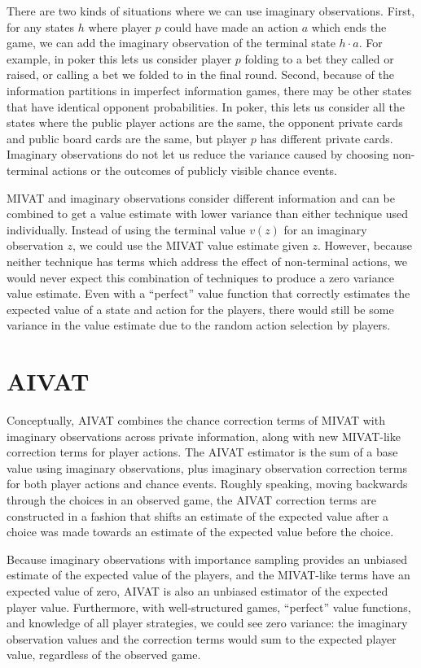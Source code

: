 \documentclass[letterpaper]{article}
\def\VAT{AIVAT}
\begin{document}
There are two kinds of situations where we can use imaginary
observations. First, for any states $h$ where player $p$ could have
made an action $a$ which ends the game, we can add the imaginary
observation of the terminal state $h \cdot a$. For example, in poker
this lets us consider player $p$ folding to a bet they called or
raised, or calling a bet we folded to in the final round. Second,
because of the information partitions in imperfect information games,
there may be other states that have identical opponent
probabilities. In poker, this lets us consider all the states where
the public player actions are the same, the opponent private cards and
public board cards are the same, but player $p$ has different private
cards. Imaginary observations do not let us reduce the variance caused
by choosing non-terminal actions or the outcomes of publicly visible
chance events.

MIVAT and imaginary observations consider different information and
can be combined to get a value estimate with lower variance than
either technique used individually. Instead of using the terminal
value $v(z)$ for an imaginary observation $z$, we could use the MIVAT
value estimate given $z$. However, because neither technique has terms
which address the effect of non-terminal actions, we would never
expect this combination of techniques to produce a zero variance value
estimate.  Even with a ``perfect'' value function that correctly
estimates the expected value of a state and action for the players,
there would still be some variance in the value estimate due to the
random action selection by players.

\section{\VAT{}}
Conceptually, \VAT{} combines the chance correction terms of MIVAT
with imaginary observations across private information, along with new
MIVAT-like correction terms for player actions. The \VAT{} estimator
is the sum of a base value using imaginary observations, plus
imaginary observation correction terms for both player actions and
chance events. Roughly speaking, moving backwards through the choices
in an observed game, the \VAT{} correction terms are constructed in a
fashion that shifts an estimate of the expected value after a choice
was made towards an estimate of the expected value before the choice.

Because imaginary observations with importance sampling provides an
unbiased estimate of the expected value of the players, and the
MIVAT-like terms have an expected value of zero, \VAT{} is also an
unbiased estimator of the expected player value. Furthermore, with
well-structured games, ``perfect'' value functions, and knowledge of
all player strategies, we could see zero variance: the imaginary
observation values and the correction terms would sum to the expected
player value, regardless of the observed game.
\end{document}
